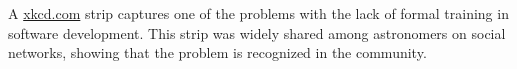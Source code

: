\label{fig:xkcd}

A \href{https://xkcd.com/1513/}{xkcd.com} strip captures one of the problems with the lack of formal training in software development. This strip was widely shared among astronomers on social networks, showing that the problem is recognized in the community.
  
  
  
  
  
  
  